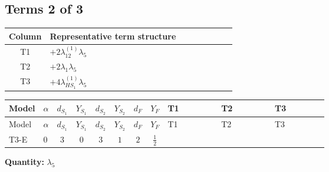 \documentclass[8pt]{article}
\begin{document}
\begin{landscape}
\subsection*{Terms 2 of 3}
\begin{center}
\begin{tabular}{@{}c >{\raggedright\arraybackslash}p{0.82\linewidth}@{}}
\toprule
Column & Representative term structure \\
\midrule
T1 & \(\displaystyle +2 {\lambda_{12}^{(1)}} {\lambda_5}\) \\
\midrule
T2 & \(\displaystyle +2 {\lambda_1} {\lambda_5}\) \\
\midrule
T3 & \(\displaystyle +4 {\lambda_{HS_1}^{(1)}} {\lambda_5}\) \\
\midrule
\bottomrule
\end{tabular}
\end{center}
\smallskip
\tiny
\begin{longtable}{@{}llcccccc >{\raggedright\arraybackslash}p{0.21\linewidth} >{\raggedright\arraybackslash}p{0.21\linewidth} >{\raggedright\arraybackslash}p{0.21\linewidth}@{}}
\toprule
Model & $\alpha$ & $d_{S_1}$ & $Y_{S_1}$ & $d_{S_2}$ & $Y_{S_2}$ & $d_F$ & $Y_F$ & T1 & T2 & T3 \\
\midrule
\endfirsthead
\toprule
Model & $\alpha$ & $d_{S_1}$ & $Y_{S_1}$ & $d_{S_2}$ & $Y_{S_2}$ & $d_F$ & $Y_F$ & T1 & T2 & T3 \\
\midrule
\endhead
T3-E & $0$ & $3$ & $0$ & $3$ & $1$ & $2$ & $\frac{1}{2}$ & \scriptsize\adjustbox{max width=\linewidth}{$\begin{gathered} +2 {\lambda_{12}^{(1)}} {\lambda_5}\end{gathered}$} & \scriptsize\adjustbox{max width=\linewidth}{$\begin{gathered} +2 {\lambda_1} {\lambda_5}\end{gathered}$} & \scriptsize\adjustbox{max width=\linewidth}{$\begin{gathered} +4 {\lambda_{HS_1}^{(1)}} {\lambda_5}\end{gathered}$} \\
\midrule
\bottomrule
\end{longtable}
\clearpage
\noindent\textbf{Quantity: }$\lambda_5$\par\smallskip

\end{landscape}
\end{document}
